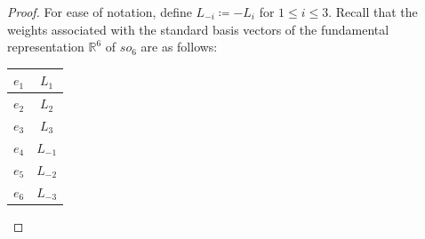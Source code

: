 \documentclass[10pt,a4paper]{amsart}
\numberwithin{equation}{section}
\theoremstyle{definition}
\def\mathfrak#1{#1}
\begin{document}
\begin{proof}
 For ease of notation, define $L_{-i} \coloneqq -L_i$ for $1 \le i \le 3$. Recall that the weights associated with the standard basis vectors of the fundamental representation $\mathbb{R}^6$ of $\mathfrak{so}_6$ are as follows:
 \begin{center}
 \begin{tabular}{|c|c|}
 \hline
 $e_1$ & $L_1$ \\
 \hline
 $e_2$ & $L_2$ \\
 \hline
 $e_3$ & $L_3$ \\
 \hline
 $e_4$ & $L_{-1}$ \\
 \hline
 $e_5$ & $L_{-2}$ \\
 \hline
 $e_6$ & $L_{-3}$ \\
 \hline
 \end{tabular}
 \end{center}


\end{proof}
\end{document}
